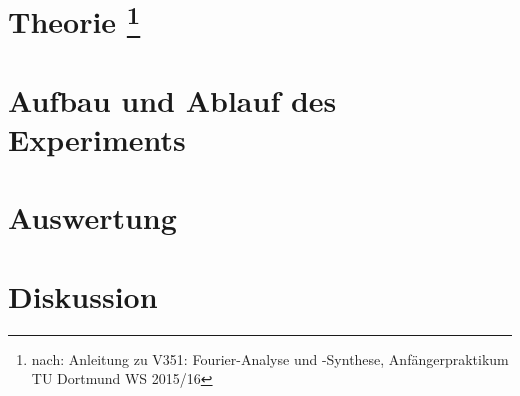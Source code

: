 \documentclass[a4,11pt]{article}
\begin{document}
	
	\tableofcontents
	\clearpage


	\section{Theorie
	\footnote{nach: Anleitung zu V351: Fourier-Analyse und -Synthese, Anfängerpraktikum TU Dortmund WS 2015/16}}
	
	\clearpage


	\section{Aufbau und Ablauf des Experiments}
	
	\clearpage
	
%	
%	


	\section{Auswertung}
	
	\clearpage


	\section{Diskussion}
	


	\todototoc
	\listoftodos
\end{document}
